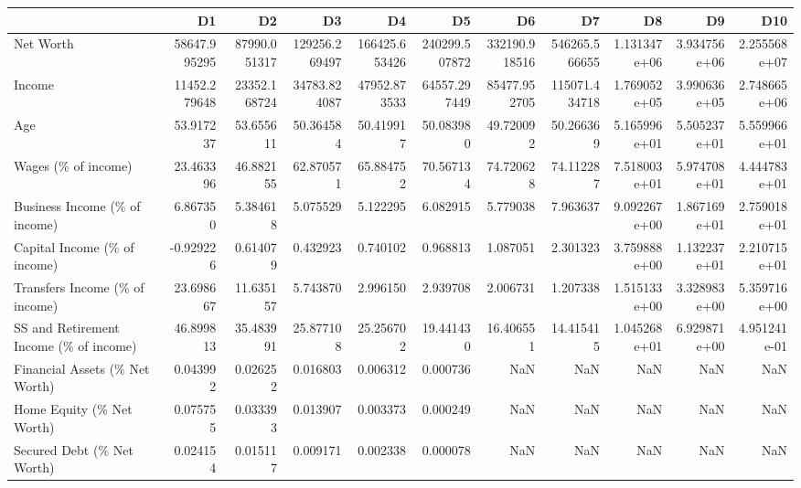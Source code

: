 \begin{tabular}{lrrrrrrrrrr}
\toprule
{} &            D1 &            D2 &             D3 &             D4 &             D5 &             D6 &             D7 &            D8 &            D9 &           D10 \\
\midrule
Net Worth                              &  58647.995295 &  87990.051317 &  129256.269497 &  166425.653426 &  240299.507872 &  332190.918516 &  546265.566655 &  1.131347e+06 &  3.934756e+06 &  2.255568e+07 \\
Income                                 &  11452.279648 &  23352.168724 &   34783.824087 &   47952.873533 &   64557.297449 &   85477.952705 &  115071.434718 &  1.769052e+05 &  3.990636e+05 &  2.748665e+06 \\
Age                                    &     53.917237 &     53.655611 &      50.364584 &      50.419917 &      50.083980 &      49.720092 &      50.266369 &  5.165996e+01 &  5.505237e+01 &  5.559966e+01 \\
Wages (\% of income)                    &     23.463396 &     46.882155 &      62.870571 &      65.884752 &      70.567134 &      74.720628 &      74.112287 &  7.518003e+01 &  5.974708e+01 &  4.444783e+01 \\
Business Income (\% of income)          &      6.867350 &      5.384618 &       5.075529 &       5.122295 &       6.082915 &       5.779038 &       7.963637 &  9.092267e+00 &  1.867169e+01 &  2.759018e+01 \\
Capital Income (\% of income)           &     -0.929226 &      0.614079 &       0.432923 &       0.740102 &       0.968813 &       1.087051 &       2.301323 &  3.759888e+00 &  1.132237e+01 &  2.210715e+01 \\
Transfers Income (\% of income)         &     23.698667 &     11.635157 &       5.743870 &       2.996150 &       2.939708 &       2.006731 &       1.207338 &  1.515133e+00 &  3.328983e+00 &  5.359716e+00 \\
SS and Retirement Income (\% of income) &     46.899813 &     35.483991 &      25.877108 &      25.256702 &      19.441430 &      16.406551 &      14.415415 &  1.045268e+01 &  6.929871e+00 &  4.951241e-01 \\
Financial Assets (\% Net Worth)         &      0.043992 &      0.026252 &       0.016803 &       0.006312 &       0.000736 &            NaN &            NaN &           NaN &           NaN &           NaN \\
Home Equity (\% Net Worth)              &      0.075755 &      0.033393 &       0.013907 &       0.003373 &       0.000249 &            NaN &            NaN &           NaN &           NaN &           NaN \\
Secured Debt (\% Net Worth)             &      0.024154 &      0.015117 &       0.009171 &       0.002338 &       0.000078 &            NaN &            NaN &           NaN &           NaN &           NaN \\
\bottomrule
\end{tabular}
